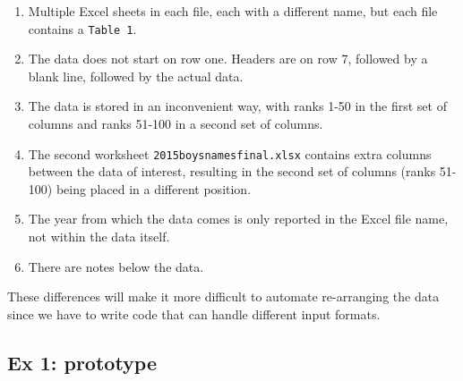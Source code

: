 \documentclass[]{book}
\newenvironment{Shaded}{\begin{snugshade}}{\end{snugshade}}
\newcommand{\CommentTok}[1]{\textcolor[rgb]{0.56,0.35,0.01}{\textit{#1}}}
\newcommand{\ControlFlowTok}[1]{\textcolor[rgb]{0.13,0.29,0.53}{\textbf{#1}}}
\newcommand{\DataTypeTok}[1]{\textcolor[rgb]{0.13,0.29,0.53}{#1}}
\newcommand{\DecValTok}[1]{\textcolor[rgb]{0.00,0.00,0.81}{#1}}
\newcommand{\KeywordTok}[1]{\textcolor[rgb]{0.13,0.29,0.53}{\textbf{#1}}}
\newcommand{\NormalTok}[1]{#1}
\newcommand{\OperatorTok}[1]{\textcolor[rgb]{0.81,0.36,0.00}{\textbf{#1}}}
\newcommand{\StringTok}[1]{\textcolor[rgb]{0.31,0.60,0.02}{#1}}
\providecommand{\tightlist}{%
  \setlength{\itemsep}{0pt}\setlength{\parskip}{0pt}}
\begin{document}
\begin{enumerate}
\def\labelenumi{\arabic{enumi}.}
\tightlist
\item
  Multiple Excel sheets in each file, each with a different name, but each file contains a \texttt{Table\ 1}.
\item
  The data does not start on row one. Headers are on row 7, followed by a blank line, followed by the actual data.
\item
  The data is stored in an inconvenient way, with ranks 1-50 in the first set of columns and ranks 51-100 in a second set of columns.
\item
  The second worksheet \texttt{2015boysnamesfinal.xlsx} contains extra columns between the data of interest, resulting in the second set of columns (ranks 51-100) being placed in a different position.
\item
  The year from which the data comes is only reported in the Excel file name, not within the data itself.
\item
  There are notes below the data.
\end{enumerate}

These differences will make it more difficult to automate
re-arranging the data since we have to write code that can handle
different input formats.

\hypertarget{ex-1-prototype-3}{%
\subsection{Ex 1: prototype}\label{ex-1-prototype-3}}

\begin{Shaded}
\end{Shaded}
\end{document}
